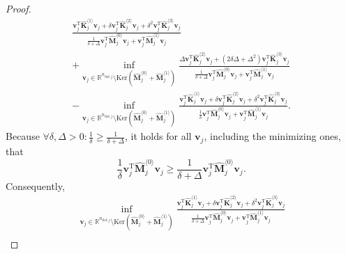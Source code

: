 \documentclass[final,onefignum,onetabnum]{siamart220329}
\newtheorem*{proof}{Proof}%
\begin{document}
\begin{proposition}
\begin{proof}
\begin{multline}
	\frac{\mathbf{v}_j^\mathrm{T} \hat{\mathbf{K}}_j^{\langle 1\rangle}\mathbf{v}_j + \delta \mathbf{v}_j^\mathrm{T}\hat{\mathbf{K}}_j^{\langle 2\rangle} \mathbf{v}_j + \delta^2 \mathbf{v}_j^\mathrm{T}\hat{\mathbf{K}}_j^{\langle 3\rangle} \mathbf{v}_j}{\frac{1}{\delta + \Delta}\mathbf{v}_j^\mathrm{T} \hat{\mathbf{M}}_j^{\langle 0\rangle} \mathbf{v}_j + \mathbf{v}_j^\mathrm{T} \hat{\mathbf{M}}_j^{\langle 1\rangle} \mathbf{v}_j} \\
	+ \inf_{\mathbf{v}_j \in \mathbb{R}^{n_{\mathrm{dof},j}}\setminus \mathrm{Ker}\left(\hat{\mathbf{M}}_j^{\langle 0\rangle}+\hat{\mathbf{M}}_j^{\langle 1\rangle}\right)} 
	\frac{\Delta \mathbf{v}_j^\mathrm{T}\hat{\mathbf{K}}_j^{\langle 2\rangle} \mathbf{v}_j + (2\delta \Delta + \Delta^2) \mathbf{v}_j^\mathrm{T}\hat{\mathbf{K}}_j^{\langle 3\rangle} \mathbf{v}_j}{\frac{1}{\delta + \Delta}\mathbf{v}_j^\mathrm{T} \hat{\mathbf{M}}_j^{\langle 0\rangle} \mathbf{v}_j + \mathbf{v}_j^\mathrm{T} \hat{\mathbf{M}}_j^{\langle 1\rangle} \mathbf{v}_j}\\
	- \inf_{\mathbf{v}_j \in \mathbb{R}^{n_{\mathrm{dof},j}}\setminus \mathrm{Ker}\left(\hat{\mathbf{M}}_j^{\langle 0\rangle}+\hat{\mathbf{M}}_j^{\langle 1\rangle}\right)} \frac{\mathbf{v}_j^\mathrm{T} \hat{\mathbf{K}}_j^{\langle 1\rangle}\mathbf{v}_j + \delta \mathbf{v}_j^\mathrm{T}\hat{\mathbf{K}}_j^{\langle 2\rangle} \mathbf{v}_j + \delta^2 \mathbf{v}_j^\mathrm{T}\hat{\mathbf{K}}_j^{\langle 3\rangle} \mathbf{v}_j}{\frac{1}{\delta}\mathbf{v}_j^\mathrm{T} \hat{\mathbf{M}}_j^{\langle 0\rangle} \mathbf{v}_j + \mathbf{v}_j^\mathrm{T} \hat{\mathbf{M}}_j^{\langle 1\rangle} \mathbf{v}_j}.
\end{multline}
%
Because $\forall \delta,\Delta >0: \frac{1}{\delta} \ge \frac{1}{\delta + \Delta}$, it holds for all $\mathbf{v}_j$, including the minimizing ones, that
\begin{equation}
	\frac{1}{\delta}\mathbf{v}_j^\mathrm{T} \hat{\mathbf{M}}_j^{\langle 0\rangle} \mathbf{v}_j \ge \frac{1}{\delta + \Delta}\mathbf{v}_j^\mathrm{T} \hat{\mathbf{M}}_j^{\langle 0\rangle} \mathbf{v}_j.
\end{equation}
%
Consequently,
% 
\begin{multline}
	\inf_{\mathbf{v}_j \in \mathbb{R}^{n_{\mathrm{dof},j}}\setminus \mathrm{Ker}\left(\hat{\mathbf{M}}_j^{\langle 0\rangle}+\hat{\mathbf{M}}_j^{\langle 1\rangle}\right)} 
	\frac{\mathbf{v}_j^\mathrm{T} \hat{\mathbf{K}}_j^{\langle 1\rangle}\mathbf{v}_j + \delta \mathbf{v}_j^\mathrm{T}\hat{\mathbf{K}}_j^{\langle 2\rangle} \mathbf{v}_j + \delta^2 \mathbf{v}_j^\mathrm{T}\hat{\mathbf{K}}_j^{\langle 3\rangle} \mathbf{v}_j}{\frac{1}{\delta + \Delta}\mathbf{v}_j^\mathrm{T} \hat{\mathbf{M}}_j^{\langle 0\rangle} \mathbf{v}_j + \mathbf{v}_j^\mathrm{T} \hat{\mathbf{M}}_j^{\langle 1\rangle} \mathbf{v}_j} \\

\end{multline}
\end{proof}
\end{proposition}
\end{document}
